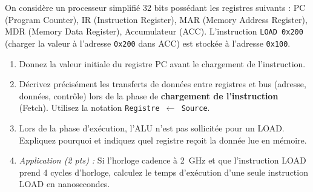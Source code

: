 \documentclass[11pt]{article}
\begin{document}
\begin{exercice}
On considère un processeur simplifié 32 bits possédant les registres suivants : PC (Program Counter), IR (Instruction Register), MAR (Memory Address Register), MDR (Memory Data Register), Accumulateur (ACC). L'instruction \texttt{LOAD 0x200} (charger la valeur à l'adresse \texttt{0x200} dans ACC) est stockée à l'adresse \texttt{0x100}.
\begin{enumerate}
    \item Donnez la valeur initiale du registre PC avant le chargement de l'instruction.
    \item Décrivez précisément les transferts de données entre registres et bus (adresse, données, contrôle) lors de la phase de \textbf{chargement de l'instruction} (Fetch). Utilisez la notation \texttt{Registre $\leftarrow$ Source}.
    \item Lors de la phase d'exécution, l'ALU n'est pas sollicitée pour un LOAD. Expliquez pourquoi et indiquez quel registre reçoit la donnée lue en mémoire.
    \item \textit{Application (2 pts) :} Si l'horloge cadence à \SI{2}{\giga\hertz} et que l'instruction LOAD prend 4 cycles d'horloge, calculez le temps d'exécution d'une seule instruction LOAD en nanosecondes.
\end{enumerate}
\end{exercice}
\end{document}

